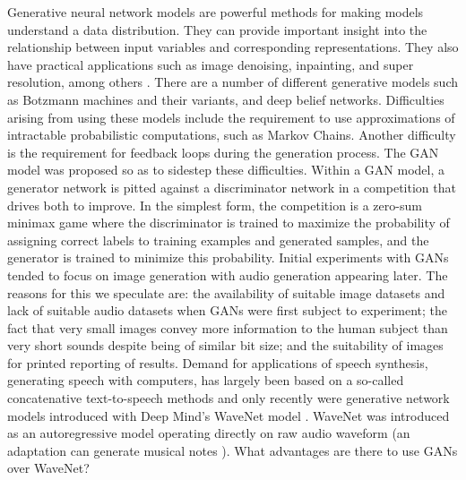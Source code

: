 \documentclass[a4paper, titlepage]{article}
\begin{document}
Generative neural network models are powerful methods for making models understand a data distribution.
They can provide important insight into the relationship between input variables and corresponding representations.
They also have practical applications such as image denoising, inpainting, and super resolution, among others \cite{openai_blog_2017}.
\newline
\newline
There are a number of different generative models such as Botzmann machines and their variants, and deep belief networks.
Difficulties arising from using these models include the requirement to use approximations of intractable probabilistic computations, such as Markov Chains.
Another difficulty is the requirement for feedback loops during the generation process.
The GAN model was proposed so as to sidestep these difficulties.
\newline
\newline
Within a GAN model, a generator network is pitted against a discriminator network in a competition that drives both to improve.
In the simplest form, the competition is a zero-sum minimax game where the discriminator is trained to maximize the probability of assigning correct labels to training examples and generated samples, and the generator is trained to minimize this probability.
\newline
\newline
Initial experiments with GANs tended to focus on image generation with audio generation appearing later.
The reasons for this we speculate are: the availability of suitable image datasets and lack of suitable audio datasets when GANs were first subject to experiment; the fact that very small images convey more information to the human subject than very short sounds despite being of similar bit size; and the suitability of images for printed reporting of results.
\newline
\newline
Demand for applications of speech synthesis, generating speech with computers, has largely been based on a so-called concatenative text-to-speech methods and only recently were generative network models introduced with Deep Mind's WaveNet model \cite{waveNetUrl}.
WaveNet was introduced as an autoregressive model operating directly on raw audio waveform \cite{DBLP:journals/corr/OordDZSVGKSK16} (an adaptation can generate musical notes \cite{2017arXiv170401279E}).
\newline
\newline
What advantages are there to use GANs over WaveNet?
\end{document}
